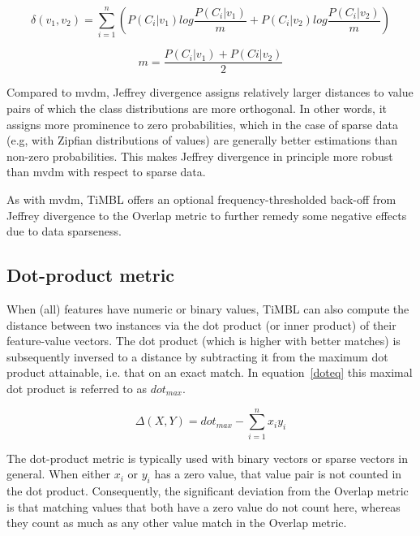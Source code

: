 \documentclass{report}
\begin{document}
\begin{equation}
\delta(v_{1}, v_{2}) = \sum_{i=1}^{n} 
( P(C_{i}|v_{1}) log \frac{P(C_{i}|v_{1})}{m} +
  P(C_{i}|v_{2}) log \frac{P(C_{i}|v_{2})}{m} )
\label{jd}
\end{equation}

\begin{equation}
m = \frac{P(C_{i}|v_{1}) + P(C{i}|v_{2})}{2}
\label{jdm}
\end{equation}

Compared to {\sc mvdm}, Jeffrey divergence assigns relatively larger
distances to value pairs of which the class distributions are more
orthogonal. In other words, it assigns more prominence to zero
probabilities, which in the case of sparse data (e.g, with Zipfian
distributions of values) are generally better estimations than
non-zero probabilities. This makes Jeffrey divergence in principle
more robust than {\sc mvdm} with respect to sparse data.

As with {\sc mvdm}, TiMBL offers an optional frequency-thresholded
back-off from Jeffrey divergence to the Overlap metric to further
remedy some negative effects due to data sparseness.

\subsection{Dot-product metric}
\label{dotproduct}

When (all) features have numeric or binary values, TiMBL can also compute 
the distance between two instances via the dot product (or inner product) 
of their feature-value vectors. The dot product (which is higher with better 
matches) is subsequently inversed to a distance by subtracting it from 
the maximum dot product attainable, i.e. that on an exact match. In 
equation~\ref{doteq} this maximal dot product is referred to as $dot_{max}$.

\begin{equation}
\label{doteq}
\Delta(X,Y) = dot_{max} - \sum_{i=1}^{n} x_{i} y_{i}
\end{equation}

The dot-product metric is typically used with binary vectors or sparse 
vectors in general. When either $x_{i}$ or $y_{i}$ has a zero value, that 
value pair is not counted in the dot product. Consequently, the significant 
deviation from the Overlap metric is that matching values that both have a 
zero value do not count here, whereas they count as much as any other value 
match in the Overlap metric.
\end{document}
